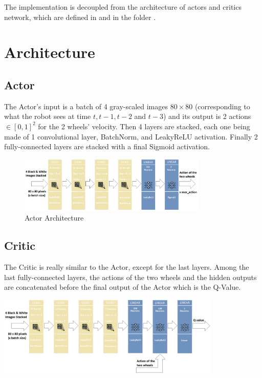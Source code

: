 The implementation is decoupled from the architecture of actors and critics network, which are defined in  and  in the folder .

\section{Architecture}%

\subsection{Actor}%

The Actor's input is a batch of 4 gray-scaled images $80\times80$ (corresponding to what the robot sees at time $t , t-1 , t-2$ and $t-3$) and its output is 2 actions $\in [0,1]^{2}$ for the 2 wheels' velocity.
Then 4 layers are stacked, each one being made of 1 convolutional layer, BatchNorm, and LeakyReLU activation.
Finally 2 fully-connected layers are stacked with a final Sigmoid activation.

\begin{figure}
    \centering
    \includegraphics[width=0.80\textwidth]{images/actor_net.png}
    \caption{Actor Architecture}
    \label{actor}
\end{figure}

\subsection{Critic}%

The Critic is really similar to the Actor, except for the last layers. Among the last fully-connected layers, the actions of the two wheels and the hidden outputs are concatenated before the final output of the Actor which is the Q-Value.

\bigbreak

\begin{minipage}{\textwidth}
    \centering
    \includegraphics[width=0.80\textwidth]{images/critic_net.png}
    \label{fig:critic}
\end{minipage}
